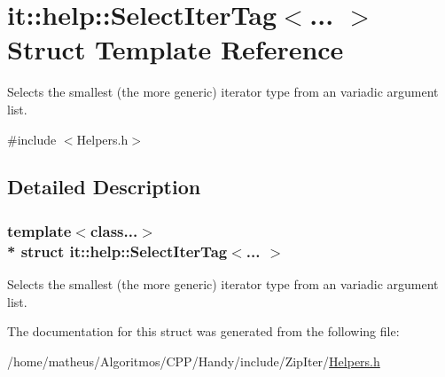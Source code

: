 \hypertarget{structit_1_1help_1_1SelectIterTag}{}\section{it\+:\+:help\+:\+:Select\+Iter\+Tag$<$... $>$ Struct Template Reference}
\label{structit_1_1help_1_1SelectIterTag}


Selects the smallest (the more generic) iterator type from an variadic argument list.  




{\ttfamily \#include $<$Helpers.\+h$>$}



\subsection{Detailed Description}
\subsubsection*{template$<$class...$>$\\*
struct it\+::help\+::\+Select\+Iter\+Tag$<$... $>$}

Selects the smallest (the more generic) iterator type from an variadic argument list. 

The documentation for this struct was generated from the following file\+:\begin{DoxyCompactItemize}
\item 
/home/matheus/\+Algoritmos/\+C\+P\+P/\+Handy/include/\+Zip\+Iter/\hyperlink{ZipIter_2Helpers_8h}{Helpers.\+h}\end{DoxyCompactItemize}
